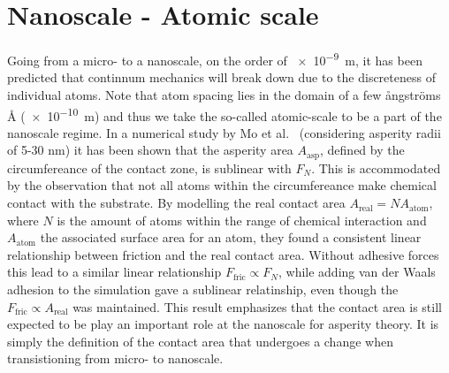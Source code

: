 

\section{Nanoscale - Atomic scale}
Going from a micro- to a nanoscale, on the order of \SI{e-9}{m}, it has been
predicted that continnum mechanics will break down \cite{luan_breakdown_2005}
due to the discreteness of individual atoms. Note that atom spacing lies in the
domain of a few ångströms Å (\SI{e-10}{m}) and thus we take the so-called atomic-scale to be a part of the nanoscale regime. In a numerical
study by Mo et al.\ \cite{mo_friction_2009} (considering asperity radii of 5-30
nm) it has been shown that the asperity area $A_{\text{asp}}$, defined by the
circumfereance of the contact zone, is sublinear with
$F_N$. This is accommodated by the observation that not all atoms within the
circumfereance make chemical contact with the substrate. By
modelling the real contact area $A_{\text{real}} = NA_{\text{atom}}$, where $N$ is the amount of atoms within the range of chemical interaction and
$A_{\text{atom}}$ the associated surface area for an atom, they found a consistent
linear relationship between friction and the real contact area. Without adhesive
forces this lead to a similar linear relationship $F_{\text{fric}} \propto F_N$,
while adding van der Waals adhesion to the simulation gave a sublinear
relatinship, even though the $F_{\text{fric}} \propto A_{\text{real}}$ was
maintained. This result emphasizes that the contact area is still expected to be play an important role at the nanoscale for asperity theory. It is simply the definition of the contact area that undergoes a change when transistioning from micro- to nanoscale. 

